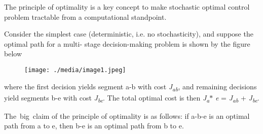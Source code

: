 \documentclass[12pt,twoside]{article}
\begin{document}
\vspace{\baselineskip}
\begin{adjustwidth}{0.08in}{0.0in}
{\fontsize{10pt}{12.0pt}\selectfont The principle of optimality is a key concept to make stochastic optimal control problem tractable from a computational standpoint.\par}\par

\end{adjustwidth}

\begin{adjustwidth}{0.08in}{0.54in}
{\fontsize{10pt}{12.0pt}\selectfont Consider the simplest case (deterministic, i.e. no stochasticity), and suppose the optimal path for a multi- stage decision-making problem is shown by the figure below\par}\par

\end{adjustwidth}


\vspace{\baselineskip}

\vspace{\baselineskip}



\begin{figure}[H]
\advance\leftskip 2.75in		\texttt{[image: ./media/image1.jpeg]}
\end{figure}



{\fontsize{10pt}{12.0pt}\selectfont \par}\par


\vspace{\baselineskip}
\begin{adjustwidth}{0.08in}{0.54in}
where the first decision yields segment a-b with cost \textit{J\textsubscript{ab}}, and remaining decisions yield segments b-e with cost \textit{J\textsubscript{be}}. The total optimal cost is then \textit{J\textsubscript{a}}$\ast$ \textit{e }= \textit{J\textsubscript{ab} }+ \textit{J\textsubscript{be}}.\par

\end{adjustwidth}

\begin{adjustwidth}{0.08in}{0.64in}
{\fontsize{10pt}{12.0pt}\selectfont The\ big\ claim of the principle of optimality is as follows:  if a-b-e is an optimal path from a to e, then b-e  is an optimal path from b to e.\par}\par

\end{adjustwidth}
\end{document}
